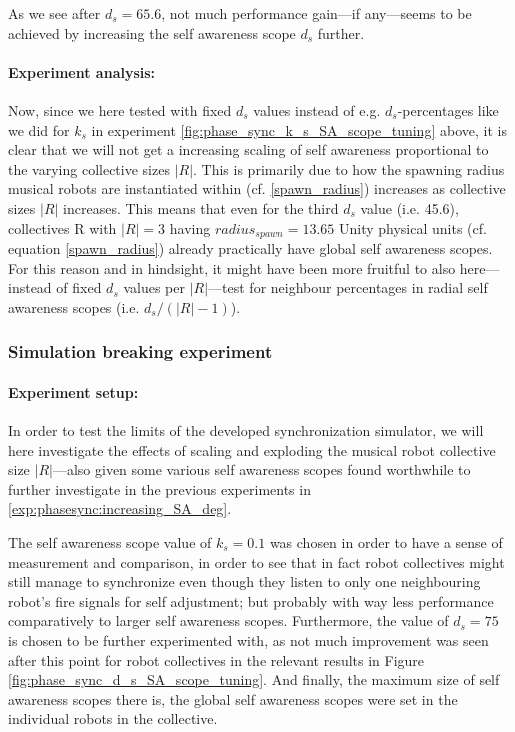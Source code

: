 				As we see after $d_s=65.6$, not much performance gain—if any—seems to be achieved by increasing the self awareness scope $d_s$ further.
				
				\paragraph{Experiment analysis:\nl}
				
				Now, since we here tested with fixed $d_s$ values instead of e.g. $d_s$-percentages like we did for $k_s$ in experiment \ref{fig:phase_sync_k_s_SA_scope_tuning} above, it is clear that we will not get a increasing scaling of self awareness proportional to the varying collective sizes $|R|$. This is primarily due to how the spawning radius musical robots are instantiated within (cf. \eqref{spawn_radius}) increases as collective sizes $|R|$ increases. This means that even for the third $d_s$ value (i.e. 45.6), collectives R with $|R|=3$ having $radius_{spawn}=13.65$ Unity physical units (cf. equation \eqref{spawn_radius}) already practically have global self awareness scopes. For this reason and in hindsight, it might have been more fruitful to also here—instead of fixed $d_s$ values per $|R|$—test for neighbour percentages in radial self awareness scopes (i.e. $d_s/(|R|-1)$).
	
	
		\subsubsection{Simulation breaking experiment}
		
			\paragraph{Experiment setup:\nl}
			
			In order to test the limits of the developed synchronization simulator, we will here investigate the effects of scaling and exploding the musical robot collective size $|R|$—also given some various self awareness scopes found worthwhile to further investigate in the previous experiments in \ref{exp:phasesync:increasing_SA_deg}.
			
			The self awareness scope value of $k_s=0.1$ was chosen in order to have a sense of measurement and comparison, in order to see that in fact robot collectives might still manage to synchronize even though they listen to only one neighbouring robot's fire signals for self adjustment; but probably with way less performance comparatively to larger self awareness scopes. Furthermore, the value of $d_s=75$ is chosen to be further experimented with, as not much improvement was seen after this point for robot collectives in the relevant results in Figure \ref{fig:phase_sync_d_s_SA_scope_tuning}. And finally, the maximum size of self awareness scopes there is, the global self awareness scopes were set in the individual robots in the collective.
			
